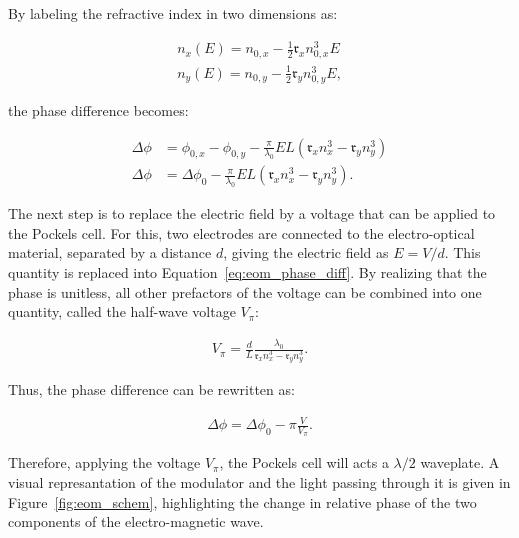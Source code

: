 By labeling the refractive index in two dimensions as:

\begin{align}
	n_x(E) = n_{0,x} - \frac{1}{2} \mathfrak{r}_x n_{0,x}^3 E \\
	n_y(E) = n_{0,y} - \frac{1}{2} \mathfrak{r}_y n_{0,y}^3 E,
\end{align}

the phase difference becomes:

\begin{align}
	\Delta \phi & = \phi_{0,x} - \phi_{0,y} - \frac{\pi}{\lambda_0} E L \left(\mathfrak{r}_x n_x^3 - \mathfrak{r}_y n_y^3\right) \\
	\Delta \phi & = \Delta \phi_{0} - \frac{\pi}{\lambda_0} E L \left(\mathfrak{r}_x n_x^3 - \mathfrak{r}_y n_y^3\right).
	\label{eq:eom_phase_diff}
\end{align}

\begin{figure}[t]%
\end{figure}

The next step is to replace the electric field by a voltage that can be applied to the Pockels cell. For this, two electrodes are connected to the electro-optical material, separated by a distance $d$, giving the electric field as $E=V/d$. This quantity is replaced into Equation~\ref{eq:eom_phase_diff}. By realizing that the phase is unitless, all other prefactors of the voltage can be combined into one quantity, called the half-wave voltage $V_\pi$:

\begin{align}
	V_\pi = \frac{d}{L} \frac{\lambda_0}{\mathfrak{r}_x n_x^3 - \mathfrak{r}_y n_y^3}.
\end{align}

Thus, the phase difference can be rewritten as:

\begin{align}
	\label{eq:eom_phase_diff}
	\Delta \phi = \Delta \phi_0 - \pi \frac{V}{V_\pi}.
\end{align}

Therefore, applying the voltage $V_\pi$, the Pockels cell will acts a $\lambda/2$ waveplate. A visual represantation of the modulator and the light passing through it is given in Figure~\ref{fig:eom_schem}, highlighting the change in relative phase of the two components of the electro-magnetic wave.

